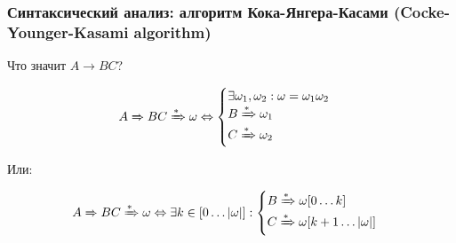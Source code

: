 \documentclass{beamer}
\newcommand{\derives}[1][*]{\xRightarrow[]{#1}}
\begin{document}
\begin{frame}[fragile]
  \transwipe[direction=90]
  \frametitle{Синтаксический анализ: алгоритм Кока-Янгера-Касами (Cocke-Younger-Kasami algorithm)}

  \begin{center}
    Что значит $A \to BC$?
  \end{center} \pause

  \[
    A \derives[]  BC  \derives \omega \Leftrightarrow
              \begin{cases}
                \exists \omega_1, \omega_2: \omega = \omega_1 \omega_2\\
                B \derives \omega_1\\
                C \derives \omega_2
              \end{cases}
  \] \pause


  \begin{center}
    Или:
  \end{center}

  \[
    A \derives[]  BC  \derives \omega \Leftrightarrow \exists k \in [0 \dots |\omega|]:
              \begin{cases}
                B \derives \omega[0 \dots k]\\
                C \derives \omega[k+1 \dots |\omega|]
              \end{cases}
  \]

\end{frame}
\end{document}
